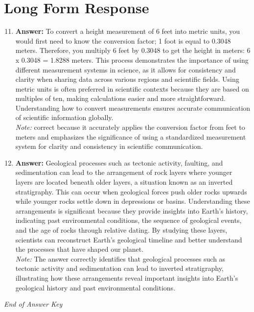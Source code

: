 \documentclass[12pt]{article}
\begin{document}
\section*{Long Form Response}
\begin{enumerate}[label=\arabic*.]
\setcounter{enumi}{10}
\item \textbf{Answer:} To convert a height measurement of 6 feet into metric units, you would first need to know the conversion factor; 1 foot is equal to 0.3048 meters. Therefore, you multiply 6 feet by 0.3048 to get the height in meters: 6 x 0.3048 = 1.8288 meters. This process demonstrates the importance of using different measurement systems in science, as it allows for consistency and clarity when sharing data across various regions and scientific fields. Using metric units is often preferred in scientific contexts because they are based on multiples of ten, making calculations easier and more straightforward. Understanding how to convert measurements ensures accurate communication of scientific information globally.
\\ \textit{Note:} correct because it accurately applies the conversion factor from feet to meters and emphasizes the significance of using a standardized measurement system for clarity and consistency in scientific communication.
\item \textbf{Answer:} Geological processes such as tectonic activity, faulting, and sedimentation can lead to the arrangement of rock layers where younger layers are located beneath older layers, a situation known as an inverted stratigraphy. This can occur when geological forces push older rocks upwards while younger rocks settle down in depressions or basins. Understanding these arrangements is significant because they provide insights into Earth's history, indicating past environmental conditions, the sequence of geological events, and the age of rocks through relative dating. By studying these layers, scientists can reconstruct Earth's geological timeline and better understand the processes that have shaped our planet.
\\ \textit{Note:} The answer correctly identifies that geological processes such as tectonic activity and sedimentation can lead to inverted stratigraphy, illustrating how these arrangements reveal important insights into Earth's geological history and past environmental conditions.
\end{enumerate}

\vfill
\noindent\textit{End of Answer Key}
\end{document}
